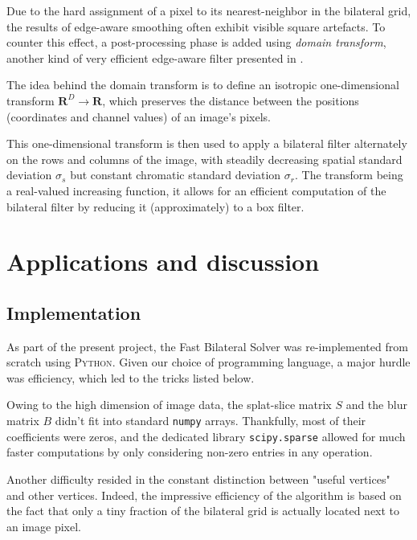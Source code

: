 \documentclass{article}
\begin{document}
Due to the hard assignment of a pixel to its nearest-neighbor in the bilateral grid, the results of edge-aware smoothing often exhibit visible square artefacts. To counter this effect, a post-processing phase is added using \textit{domain transform}, another kind of very efficient edge-aware filter presented in \cite{gastal_domain_2011}.

\medskip

The idea behind the domain transform is to define an isotropic one-dimensional transform $\mathbf{R}^D \to \mathbf{R}$, which preserves the distance between the positions (coordinates and channel values) of an image's pixels.

This one-dimensional transform is then used to apply a bilateral filter alternately on the rows and columns of the image, with steadily decreasing spatial standard deviation $\sigma_s$ but constant chromatic standard deviation $\sigma_r$. The transform being a real-valued increasing function, it allows for an efficient computation of the bilateral filter by reducing it (approximately) to a box filter.

\section{Applications and discussion}

\subsection{Implementation}

As part of the present project, the Fast Bilateral Solver was re-implemented from scratch using \textsc{Python}. Given our choice of programming language, a major hurdle was efficiency, which led to the tricks listed below.

\medskip

Owing to the high dimension of image data, the splat-slice matrix $S$ and the blur matrix $B$ didn't fit into standard \texttt{numpy} arrays. Thankfully, most of their coefficients were zeros, and the dedicated library \texttt{scipy.sparse} allowed for much faster computations by only considering non-zero entries in any operation.

\medskip

Another difficulty resided in the constant distinction between "useful vertices" and other vertices. Indeed, the impressive efficiency of the algorithm is based on the fact that only a tiny fraction of the bilateral grid is actually located next to an image pixel.
\end{document}
